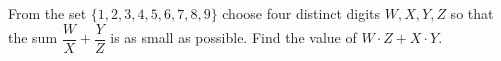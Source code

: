From the set $\{1, 2, 3, 4, 5, 6, 7, 8, 9\}$ choose four distinct digits $W, X, Y, Z$ so that the sum $\dfrac{W}{X}+\dfrac{Y}{Z}$ is as small as possible. Find the value of $W \cdot Z+X \cdot Y$.
